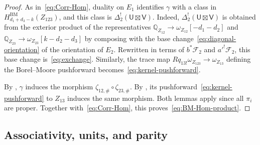 \documentclass[11pt,a4paper]{amsart}
\theoremstyle{definition}
\theoremstyle{remark}
\newcommand{\Q}{\mathbb Q}
\newcommand{\BM}{\mathrm{BM}}
\numberwithin{equation}{section}
\begin{document}
\begin{proof}
As in~\eqref{eq:Corr-Hom}, duality on $E_1$ identifies $\gamma$ with a
class in $H^{\BM}_{d_1+d_3-k}(Z_{123})$, and this class is
$\Delta_2^!(\mathsf U\boxtimes\mathsf V)$. Indeed,
$\Delta_2^!(\mathsf U\boxtimes\mathsf V)$ is obtained from the exterior
product of the representatives $\Q_{Z_{12}}\to\omega_{Z_{12}}[-d_1-d_2]$
and $\Q_{Z_{23}}\to\omega_{Z_{23}}[k-d_2-d_3]$ by composing with the
base change~\eqref{eq:diagonal-orientation} of the orientation of $E_2$.
Rewritten in terms of $b^*\mathcal F_2$ and $a'^!\mathcal F_2$, this base
change is~\eqref{eq:exchange}. Similarly, the trace map
$Rq_{13!}\omega_{Z_{123}}\to\omega_{Z_{13}}$ defining the Borel--Moore
pushforward becomes~\eqref{eq:kernel-pushforward}.

By \cite[Lemma~A.3.1]{Yun}, $\gamma$ induces the morphism
$\zeta_{12,\#}\circ\zeta_{23,\#}$. By \cite[Lemma~A.1.2]{Yun}, its
pushforward~\eqref{eq:kernel-pushforward} to $Z_{13}$ induces the same
morphism.
Both lemmas apply since all $\pi_i$ are proper. Together
with~\eqref{eq:Corr-Hom}, this proves~\eqref{eq:BM-Hom-product}.
\end{proof}

\subsection{Associativity, units, and parity}
\label{app:associativity}
\end{document}
